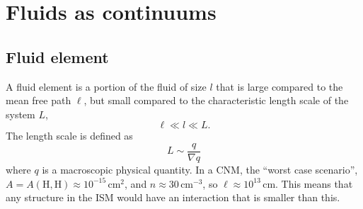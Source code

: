 \chapter{Fluids as continuums}
\section{Fluid element}
A \textsf{fluid element} is a portion of the fluid of size $l$ that is large compared to the mean free path $\ell$, but small compared to the characteristic length scale of the system $L$,
\begin{equation}
  \ell \ll l \ll L. 
\end{equation}
The length scale is defined as
\begin{equation}
  L\sim\frac{q}{\nabla q}
\end{equation}
where $q$ is a macroscopic physical quantity. In a CNM, the ``worst case scenario'', $A = A(\text{H},\text{H})\approx 10^{-15}\,\text{cm}^{2}$, and $n\approx30\,\text{cm}^{-3}$, so $\ell\approx10^{13}\,\text{cm}$. This means that any structure in the ISM would have an interaction that is smaller than this. 

